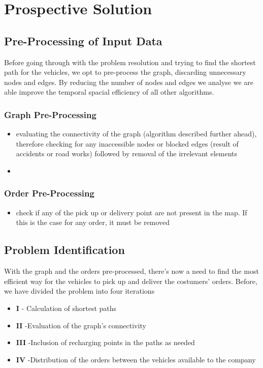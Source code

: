 \chapter{Prospective Solution}

\section{Pre-Processing of Input Data}
Before going through with the problem resolution and trying to find the shortest path for the vehicles, we opt to pre-process the graph, discarding unnecessary nodes and edges. By reducing the number of nodes and edges we analyse we are able improve the temporal spacial efficiency of all other algorithms. 


\subsection{Graph Pre-Processing}
\begin{itemize}
    \item evaluating the connectivity of the graph (algorithm described further ahead), therefore checking for any inaccessible nodes or blocked edges (result of accidents or road works) followed by removal of the irrelevant elements
    \item 
\end{itemize}


\subsection{Order Pre-Processing}
\begin{itemize}
    \item check if any of the pick up or delivery point are not present in the map. If this is the case for any order, it must be removed
\end{itemize}



\section{Problem Identification}

With the graph and the orders pre-processed, there's now a need to find the most efficient way for the vehicles to pick up and deliver the costumers' orders. Before, we have divided the problem into four iterations 
\begin{itemize}
    \item \textbf{I} - Calculation of shortest paths
    \item \textbf{II} -Evaluation of the graph's connectivity
    \item \textbf{III} -Inclusion of recharging points in the paths as needed
    \item \textbf{IV} -Distribution of the orders between the vehicles available to the company
\end{itemize}



